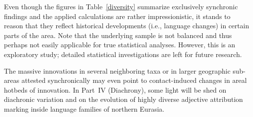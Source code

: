 Even though the figures in Table~\ref{diversity} summarize exclusively synchronic findings and the applied calculations are rather impressionistic, it stands to reason that they reflect historical developments (i.e., language changes) in certain parts of the area. Note that the underlying sample is not balanced and thus perhaps not easily applicable for true statistical analyses. However, this is an exploratory study; detailed statistical investigations are left for future research.

The massive innovations in several neighboring taxa or in larger geographic sub-areas attested synchronically may even point to contact-induced changes in areal hotbeds of innovation. In Part~IV (Diachrony), some light will be shed on diachronic variation and on the evolution of highly diverse adjective attribution marking inside language families of northern Eurasia.


\newcommand{\divvaltabheader}{& \textit{Family} & Languages & Types & \parbox{1cm}{Ratio (tax.)} 
					  & \parbox{1cm}{Ratio (lgs.)} 
					      & \parbox{2.2cm}{\centering Diversity 
							      \newline value}\\}

